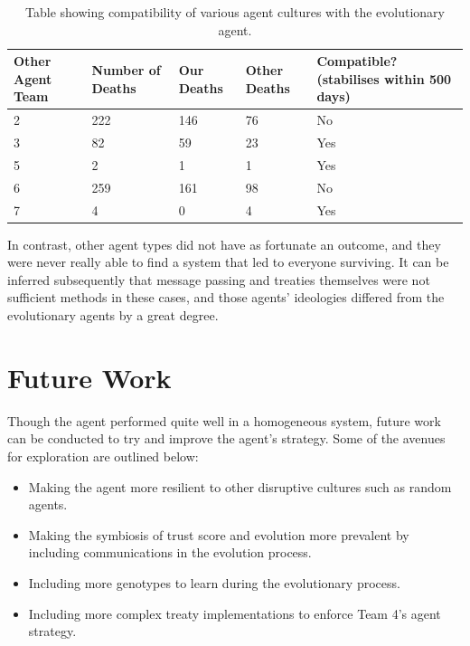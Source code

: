 \begin{table}[htb]
    \centering
    \begin{tabular}{|p{5em}|p{5em}|p{5em}|p{5em}|p{9em}|}
    \hline
        Other Agent Team & Number of Deaths & Our Deaths & Other Deaths & Compatible? (stabilises within 500 days) \\
         \hline
         \hline
        2 & 222 & 146 & 76 & No \\
         \hline
        3 & 82 & 59 & 23 & Yes \\
         \hline
        5 & 2 & 1 & 1 & Yes \\
         \hline
        6 & 259 & 161 & 98 & No \\
         \hline
        7 & 4 & 0 & 4 & Yes \\
         \hline
    \end{tabular}
    \caption{Table showing compatibility of various agent cultures with the evolutionary agent.}
    \label{tab:agentCompatibility}
\end{table}

In contrast, other agent types did not have as fortunate an outcome, and they were never really able to find a system that led to everyone surviving. It can be inferred subsequently that message passing and treaties themselves were not sufficient methods in these cases, and those agents' ideologies differed from the evolutionary agents by a great degree.

\section{Future Work}
Though the agent performed quite well in a homogeneous system, future work can be conducted to try and improve the agent's strategy. Some of the avenues for exploration are outlined below:
\begin{itemize}
    \item Making the agent more resilient to other disruptive cultures such as random agents.
    \item Making the symbiosis of trust score and evolution more prevalent by including communications in the evolution process.
    \item Including more genotypes to learn during the evolutionary process.
    \item Including more complex treaty implementations to enforce Team 4's agent strategy.
\end{itemize}